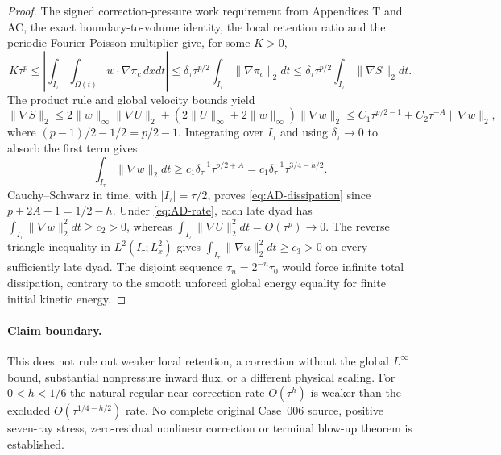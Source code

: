 \begin{proof}
The signed correction-pressure work requirement from Appendices T and AC, the exact boundary-to-volume identity, the local retention ratio and the periodic Fourier Poisson multiplier give, for some $K>0$,
\[
 K\tau^p\le\left|\int_{I_\tau}\int_{\Omega(t)}w\cdot\nabla\pi_c\,dxdt\right|
 \le\delta_\tau\tau^{p/2}\int_{I_\tau}\|\nabla\pi_c\|_2dt
 \le\delta_\tau\tau^{p/2}\int_{I_\tau}\|\nabla S\|_2dt.
\]
The product rule and global velocity bounds yield
\[
 \|\nabla S\|_2\le 2\|w\|_\infty\|\nabla U\|_2+
 (2\|U\|_\infty+2\|w\|_\infty)\|\nabla w\|_2
 \le C_1\tau^{p/2-1}+C_2\tau^{-A}\|\nabla w\|_2,
\]
where $(p-1)/2-1/2=p/2-1$. Integrating over $I_\tau$ and using $\delta_\tau\to0$ to absorb the first term gives
\[
 \int_{I_\tau}\|\nabla w\|_2dt\ge
 c_1\delta_\tau^{-1}\tau^{p/2+A}
 =c_1\delta_\tau^{-1}\tau^{3/4-h/2}.
\]
Cauchy--Schwarz in time, with $|I_\tau|=\tau/2$, proves \eqref{eq:AD-dissipation} since $p+2A-1=1/2-h$. Under \eqref{eq:AD-rate}, each late dyad has $\int_{I_\tau}\|\nabla w\|_2^2dt\ge c_2>0$, whereas $\int_{I_\tau}\|\nabla U\|_2^2dt=O(\tau^p)\to0$. The reverse triangle inequality in $L^2(I_\tau;L^2_x)$ gives $\int_{I_\tau}\|\nabla u\|_2^2dt\ge c_3>0$ on every sufficiently late dyad. The disjoint sequence $\tau_n=2^{-n}\tau_0$ would force infinite total dissipation, contrary to the smooth unforced global energy equality for finite initial kinetic energy.
\end{proof}
\paragraph{Claim boundary.}
This does not rule out weaker local retention, a correction without the global $L^\infty$ bound, substantial nonpressure inward flux, or a different physical scaling. For $0<h<1/6$ the natural regular near-correction rate $O(\tau^h)$ is weaker than the excluded $O(\tau^{1/4-h/2})$ rate. No complete original Case~006 source, positive seven-ray stress, zero-residual nonlinear correction or terminal blow-up theorem is established.
